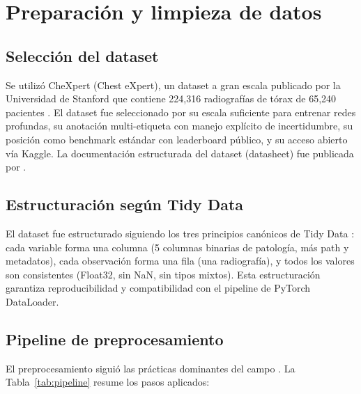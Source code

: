 \section{Preparaci\'on y limpieza de datos}
\label{sec:data-preparation}

\subsection{Selecci\'on del dataset}

Se utiliz\'o CheXpert (Chest eXpert), un dataset a gran escala publicado por la Universidad de Stanford que contiene 224,316 radiograf\'ias de t\'orax de 65,240 pacientes \cite{irvin2019chexpert}. El dataset fue seleccionado por su escala suficiente para entrenar redes profundas, su anotaci\'on multi-etiqueta con manejo expl\'icito de incertidumbre, su posici\'on como benchmark est\'andar con leaderboard p\'ublico, y su acceso abierto v\'ia Kaggle. La documentaci\'on estructurada del dataset (datasheet) fue publicada por \cite{garbin2021datasheet}.

\subsection{Estructuraci\'on seg\'un Tidy Data}

El dataset fue estructurado siguiendo los tres principios can\'onicos de Tidy Data \cite{wickham2014tidy}: cada variable forma una columna (5 columnas binarias de patolog\'ia, m\'as path y metadatos), cada observaci\'on forma una fila (una radiograf\'ia), y todos los valores son consistentes (Float32, sin NaN, sin tipos mixtos). Esta estructuraci\'on garantiza reproducibilidad y compatibilidad con el pipeline de PyTorch DataLoader.

\subsection{Pipeline de preprocesamiento}

El preprocesamiento sigui\'o las pr\'acticas dominantes del campo \cite{calli2021deep}. La Tabla~\ref{tab:pipeline} resume los pasos aplicados:

